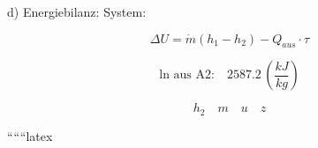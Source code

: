 d) Energiebilanz: System:

\[
\Delta U = \dot{m} (h_1 - h_2) - Q_{aus} \cdot \tau
\]

\[
\text{ln aus A2:} \quad 2587.2 \, \left( \frac{kJ}{kg} \right)
\]

\[
h_2 \quad m \quad u \quad z
\]

``````latex